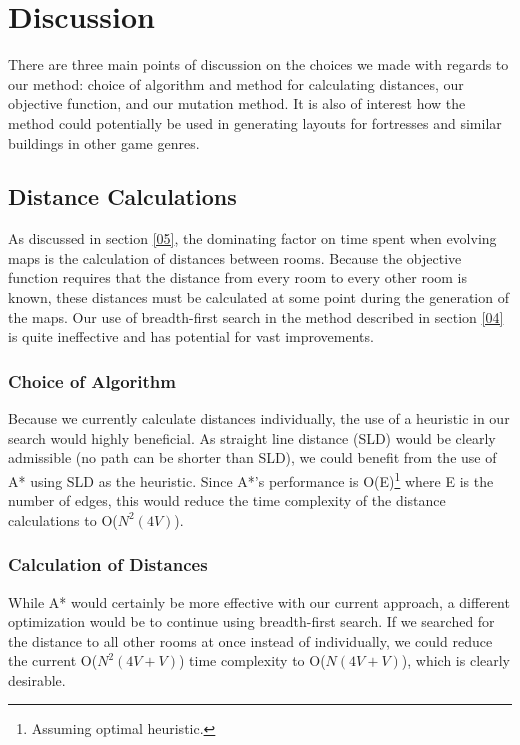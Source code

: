 \section{Discussion}
\label{06}
There are three main points of discussion on the choices we made with regards to our method: choice of algorithm and method for calculating distances, our objective function, and our mutation method. It is also of interest how the method could potentially be used in generating layouts for fortresses and similar buildings in other game genres.

\subsection{Distance Calculations}
\label{06_Distances}
As discussed in section \ref{05}, the dominating factor on time spent when evolving maps is the calculation of distances between rooms. Because the objective function requires that the distance from every room to every other room is known, these distances must be calculated at some point during the generation of the maps. Our use of breadth-first search in the method described in section \ref{04} is quite ineffective and has potential for vast improvements.

\subsubsection{Choice of Algorithm}
Because we currently calculate distances individually, the use of a heuristic in our search would highly beneficial. As straight line distance (SLD) would be clearly admissible (no path can be shorter than SLD), we could benefit from the use of A*\cite{AStar, AStarOriginal} using SLD as the heuristic. Since A*'s performance is O(E)\cite{russell3rd}\footnote{Assuming optimal heuristic.} where E is the number of edges, this would reduce the time complexity of the distance calculations to O($N^2(4V)$).

\subsubsection{Calculation of Distances}
While A* would certainly be more effective with our current approach, a different optimization would be to continue using breadth-first search. If we searched for the distance to all other rooms at once instead of individually, we could reduce the current O($N^2(4V+V)$) time complexity to O($N(4V+V)$), which is clearly desirable. 

